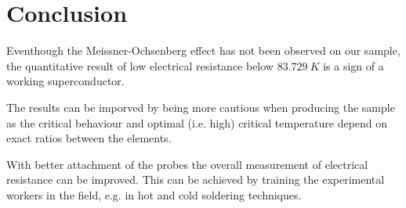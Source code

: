 \section{Conclusion}
\label{sec:conclusion}
Eventhough the Meissner-Ochsenberg effect has not been observed on our sample, the quantitative
result of low electrical resistance below $\SI{83.729}{K}$ is a sign of a working superconductor.

The results can be imporved by being more cautious when producing the sample as the critical
behaviour and optimal (i.e. high) critical temperature depend on exact ratios between the elements.

With better attachment of the probes the overall measurement of electrical resistance can be
improved. This can be achieved by training the experimental workers in the field, e.g. in hot and
cold soldering techniques.

